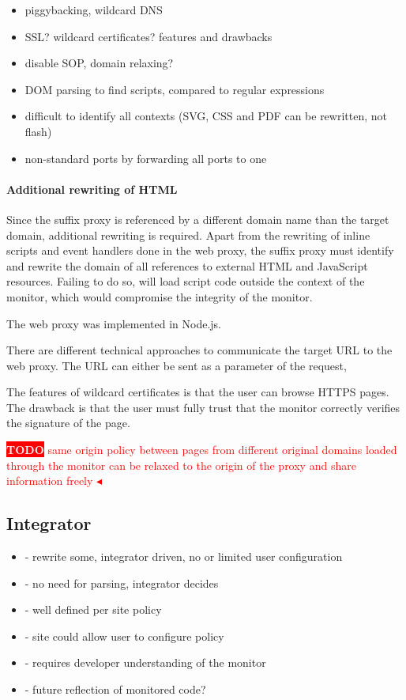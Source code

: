 \documentclass{llncs}
\newcommand{\todo}[1]{\colorbox{red}{\textcolor{white}{\sffamily\bfseries\scriptsize TODO}} \textcolor{red}{#1} \textcolor{red}{$\blacktriangleleft$}}
\begin{document}
\begin{itemize}
\item piggybacking, wildcard DNS
\item SSL? wildcard certificates? features and drawbacks 
\item disable SOP, domain relaxing?
\item DOM parsing to find scripts, compared to regular expressions
\item difficult to identify all contexts (SVG, CSS and PDF can be rewritten, not flash)
\item non-standard ports by forwarding all ports to one
\end{itemize}


\paragraph{Additional rewriting of HTML}
Since the suffix proxy is referenced by a different domain name than the target 
domain, additional rewriting is required. Apart from the rewriting of inline 
scripts and event handlers done in the web proxy, the suffix proxy must 
identify and rewrite the domain of all references to external HTML and 
JavaScript resources. Failing to do so, will load script code outside the 
context of the monitor, which would compromise the integrity of the monitor.

The web proxy was implemented in Node.js. 

There are different technical approaches to communicate the target URL to the web 
proxy. The URL can either be sent as a parameter of the request, 

The features of wildcard certificates is that the user can browse HTTPS pages. The drawback is that the user must fully trust that the monitor correctly verifies the signature of the page.

\todo{same origin policy between pages from different original domains loaded through the monitor can be relaxed to the origin of the proxy and share information freely}



\subsection{Integrator}

\begin{itemize}
\item- rewrite some, integrator driven, no or limited user configuration
\item- no need for parsing, integrator decides
\item- well defined per site policy
\item- site could allow user to configure policy
\item- requires developer understanding of the monitor
\item- future reflection of monitored code?
\end{itemize}
\end{document}

